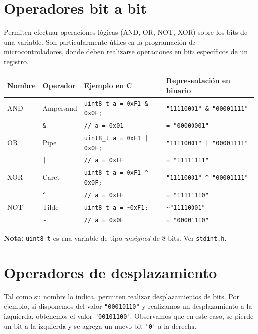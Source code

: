 \documentclass[paper=a4, fontsize=11pt]{scrartcl}	%
\numberwithin{equation}{section} %
\numberwithin{figure}{section} %
\numberwithin{table}{section} %
\begin{document}
\section{Operadores bit a bit}

Permiten efectuar operaciones lógicas (AND, OR, NOT, XOR) sobre los bits
de una variable. Son particularmente útiles en la programación de
microcontroladores, donde deben realizarse operaciones en bits
específicos de un registro.

\begin{table}[h]
  \centering
  \small
  \begin{tabular}{l | l | l | l}
    \hline
    \textbf{Nombre} & \textbf{Operador} & \textbf{Ejemplo en C} & \textbf{Representación en binario} \\ \hline
    AND & Ampersand & \verb!uint8_t a = 0xF1 & 0x0F;! & \verb!"11110001" & "00001111"! \\
    & \verb!&! & \verb!// a = 0x01! & \verb!= "00000001"! \\ \hline
    OR & Pipe & \verb!uint8_t a = 0xF1 | 0x0F;! & \verb!"11110001" | "00001111"!  \\
    & \verb!|! & \verb!// a = 0xFF! & \verb!= "11111111"! \\ \hline
    XOR & Caret & \verb!uint8_t a = 0xF1 ^ 0x0F;!  & \verb!"11110001" ^ "00001111"!  \\
    & \verb!^! & \verb!// a = 0xFE! & \verb!= "11111110"! \\ \hline
    NOT  & Tilde & \verb!uint8_t a = ~0xF1;! & \verb!~"11110001"! \\
    & \verb!~! & \verb!// a = 0x0E! & \verb!= "00001110"! \\ \hline
  \end{tabular}
\end{table}
\textbf{Nota:} \verb|uint8_t| es una variable de tipo \emph{unsigned} de
8 bits. Ver \verb|stdint.h|.

\section{Operadores de desplazamiento}

Tal como su nombre lo indica, permiten realizar desplazamientos de bits.
Por ejemplo, si disponemos del valor \verb|"00010110"| y realizamos un
desplazamiento a la izquierda, obtenemos el valor \verb|"00101100"|. Observamos
que en este caso, se {pierde} un bit a la izquierda y se
{agrega} un nuevo bit \verb|'0'| a la derecha.
\end{document}

